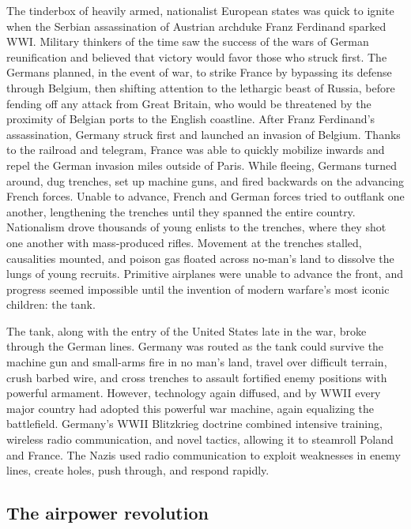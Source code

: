 \documentclass[nobib]{tufte-handout}
\begin{document}
The tinderbox of heavily armed, nationalist European states 
was quick to ignite when the Serbian assassination of Austrian archduke 
Franz Ferdinand sparked WWI. Military thinkers of the time 
saw the success of the wars of German reunification 
and believed that victory would favor those who struck first.
The Germans planned, in the event of war, to strike France 
by bypassing its defense through Belgium, then shifting 
attention to the lethargic beast of Russia, before fending 
off any attack from Great Britain, who would be threatened 
by the proximity of Belgian ports to the English coastline. 
After Franz Ferdinand's assassination, Germany struck first
and launched an invasion of Belgium. Thanks to the railroad 
and telegram, France was able to quickly mobilize inwards and 
repel the German invasion miles outside of Paris. While fleeing, 
Germans turned around, dug trenches, set up machine guns, 
and fired backwards on the advancing French forces. Unable 
to advance, French and German forces tried to outflank 
one another, lengthening the trenches until they spanned the entire country. 
Nationalism drove thousands of young enlists to the trenches, 
where they shot one another with mass-produced rifles. 
Movement at the trenches stalled, causalities mounted, 
and poison gas floated across no-man's land to dissolve the 
lungs of young recruits. Primitive airplanes were unable to 
advance the front, and progress seemed impossible until 
the invention of modern warfare's most iconic children: 
the tank. 

The tank, along with the entry of the United States late 
in the war, broke through the German lines. Germany was routed 
as the tank could survive the machine gun and small-arms 
fire in no man's land, travel over difficult terrain, 
crush barbed wire, and cross trenches to assault 
fortified enemy positions with powerful armament. However, 
technology again diffused, and by WWII every major country had 
adopted this powerful war machine, again equalizing the 
battlefield. Germany's WWII Blitzkrieg doctrine combined intensive training,
wireless radio communication, and novel tactics, allowing it 
to steamroll Poland and France. The Nazis used radio communication to 
exploit weaknesses in enemy lines, create holes, push through, 
and respond rapidly. 

\subsection{The airpower revolution}
\end{document}
